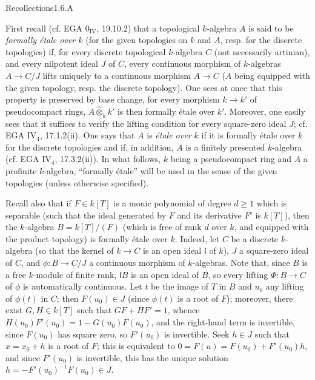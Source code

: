 \begin{enoncerm}{Recollections}{1.6.A}\label{VIIB.1.6.A}
\begin{enumeratei}
\item First recall (cf. EGA $0_{\mathrm{IV}}$, 19.10.2) that a topological $k$-algebra $A$ is said to be \emph{formally étale over $k$} (for the given topologies on $k$ and $A$, resp. for the discrete topologies) if, for every discrete topological $k$-algebra $C$ (not necessarily artinian), and every nilpotent ideal $J$ of $C$, every continuous morphism of $k$-algebras $A\to C/J$ lifts uniquely to a continuous morphism $A\to C$ ($A$ being equipped with the given topology, resp. the discrete topology). One sees at once that this property is preserved by base change, \ie for every morphism $k\to k'$ of pseudocompact rings, $A\widehat\otimes_k k'$ is then formally étale over $k'$. Moreover, one easily sees that it suffices to verify the lifting condition for every square-zero ideal $J$; cf. EGA IV$_4$, 17.1.2(ii). One says that $A$ is \emph{étale over $k$} if it is formally étale over $k$ for the discrete topologies and if, in addition, $A$ is a finitely presented $k$-algebra (cf. EGA IV$_4$, 17.3.2(ii)). In what follows, $k$ being a pseudocompact ring and $A$ a profinite $k$-algebra, ``formally étale'' will be used in the sense of the given topologies (unless otherwise specified).
\item Recall also that if $F\in k[T]$ is a monic polynomial of degree $d\geq1$ which is separable (\ie such that the ideal generated by $F$ and its derivative $F'$ is $k[T]$), then the $k$-algebra $B=k[T]/(F)$ (which is free of rank $d$ over $k$, and equipped with the product topology) is formally étale over $k$.
Indeed, let $C$ be a discrete $k$-algebra (so that the kernel of $k\to C$ is an open ideal $\mathfrak l$ of $k$), $J$ a square-zero ideal of $C$, and $\phi:B\to C/J$ a continuous morphism of $k$-algebras. Note that, since $B$ is a free $k$-module of finite rank, $\mathfrak lB$ is an open ideal of $B$, so every lifting $\Phi:B\to C$ of $\phi$ is automatically continuous. Let $t$ be the image of $T$ in $B$ and $u_0$ any lifting of $\phi(t)$ in $C$; then $F(u_0)\in J$ (since $\phi(t)$ is a root of $F$); moreover, there exist $G,H\in k[T]$ such that $GF+HF'=1$, whence $H(u_0)F'(u_0)=1-G(u_0)F(u_0)$, and the right-hand term is invertible, since $F(u_0)$ has square zero, so $F'(u_0)$ is invertible. Seek $h\in J$ such that $x=x_0+h$ is a root of $F$; this is equivalent to $0=F(u)=F(u_0)+F'(u_0)h$, and since $F'(u_0)$ is invertible, this has the unique solution $h=-F'(u_0)^{-1}F(u_0)\in J$.

\end{enumeratei}
\end{enoncerm}
